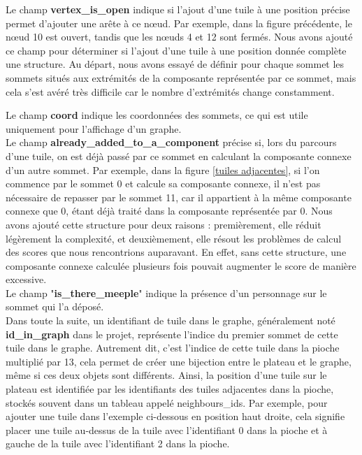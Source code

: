 \documentclass[10pt]{article}
\begin{document}
 Le champ \textbf{vertex\_is\_open} indique si l'ajout d'une tuile à une position précise permet d'ajouter une arête à ce nœud. Par exemple, dans la figure précédente, le nœud 10 est ouvert, tandis que les nœuds 4 et 12 sont fermés. Nous avons ajouté ce champ pour déterminer si l'ajout d'une tuile à une position donnée complète une structure. Au départ, nous avons essayé de définir pour chaque sommet les sommets situés aux extrémités de la composante représentée par ce sommet, mais cela s'est avéré très difficile car le nombre d'extrémités change constamment.





 
 
 
 Le champ \textbf{coord} indique les coordonnées des sommets, ce qui est utile uniquement pour l'affichage d'un graphe.\\ 

 
Le champ \textbf{already\_added\_to\_a\_component} précise si, lors du parcours d'une tuile, on est déjà passé par ce sommet en calculant la composante connexe d'un autre sommet. Par exemple, dans la figure \ref{tuiles adjacentes}, si l'on commence par le sommet 0 et calcule sa composante connexe, il n'est pas nécessaire de repasser par le sommet 11, car il appartient à la même composante connexe que 0, étant déjà traité dans la composante représentée par 0. Nous avons ajouté cette structure pour deux raisons : premièrement, elle réduit légèrement la complexité, et deuxièmement, elle résout les problèmes de calcul des scores que nous rencontrions auparavant. En effet, sans cette structure, une composante connexe calculée plusieurs fois pouvait augmenter le score de manière excessive.\\

Le champ "\textbf{is\_there\_meeple}" indique la présence d'un personnage sur le sommet qui l'a déposé.\\



 
 Dans toute la suite, un identifiant de tuile dans le graphe, généralement noté \textbf{id\_in\_graph} dans le projet, représente l'indice du premier sommet de cette tuile dans le graphe. Autrement dit, c'est l'indice de cette tuile dans la pioche multiplié par 13, cela permet de créer une bijection entre le plateau et le graphe, même si ces deux objets sont différents. Ainsi, la position d'une tuile sur le plateau est identifiée par les identifiants des tuiles adjacentes dans la pioche, stockés souvent dans un tableau appelé neighbours\_ids. Par exemple, pour ajouter une tuile dans l'exemple ci-dessous en position haut droite, cela signifie placer une tuile au-dessus de la tuile avec l'identifiant 0 dans la pioche et à gauche de la tuile avec l'identifiant 2 dans la pioche.
 
\end{document}
